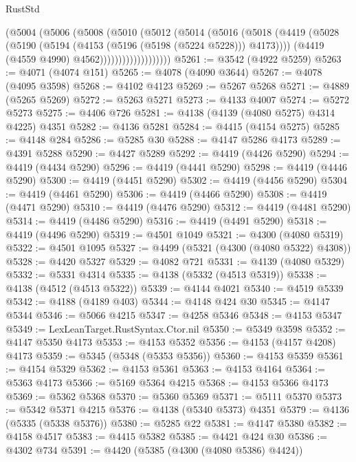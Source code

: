 \begin{lexlean}{RustStd}
\begin{coremodule}
                      (@5004
                        (@5006
                          (@5008
                            (@5010
                              (@5012
                                (@5014
                                  (@5016
                                    (@5018
                                      (@4419
                                        (@5028
                                          (@5190
                                            (@5194 (@4153 (@5196 (@5198 (@5224 @5228))) @4173))))
                                        (@4419 (@4559 @4990) @4562)))))))))))))))))))
@5261 := @3542 (@4922 @5259)
@5263 := @4071 (@4074 @151)
@5265 := @4078 (@4090 @3644)
@5267 := @4078 (@4095 @3598)
@5268 := @4102 @4123
@5269 := @5267 @5268
@5271 := @4889 (@5265 @5269)
@5272 := @5263 @5271
@5273 := @4133 @4007
@5274 := @5272 @5273
@5275 := @4406 @726
@5281 := @4138 (@4139 (@4080 @5275) @4314 @4225) @4351
@5282 := @4136 @5281
@5284 := @4415 (@4154 @5275)
@5285 := @4148 @284
@5286 := @5285 @30
@5288 := @4147 @5286 @4173
@5289 := @4391 @5288
@5290 := @4427 @5289
@5292 := @4419 (@4426 @5290)
@5294 := @4419 (@4434 @5290)
@5296 := @4419 (@4441 @5290)
@5298 := @4419 (@4446 @5290)
@5300 := @4419 (@4451 @5290)
@5302 := @4419 (@4456 @5290)
@5304 := @4419 (@4461 @5290)
@5306 := @4419 (@4466 @5290)
@5308 := @4419 (@4471 @5290)
@5310 := @4419 (@4476 @5290)
@5312 := @4419 (@4481 @5290)
@5314 := @4419 (@4486 @5290)
@5316 := @4419 (@4491 @5290)
@5318 := @4419 (@4496 @5290)
@5319 := @4501 @1049
@5321 := @4300 (@4080 @5319)
@5322 := @4501 @1095
@5327 := @4499 (@5321 (@4300 (@4080 @5322) @4308))
@5328 := @4420 @5327
@5329 := @4082 @721
@5331 := @4139 (@4080 @5329)
@5332 := @5331 @4314
@5335 := @4138 (@5332 (@4513 @5319))
@5338 := @4138 (@4512 (@4513 @5322))
@5339 := @4144 @4021
@5340 := @4519 @5339
@5342 := @4188 (@4189 @403)
@5344 := @4148 @424 @30
@5345 := @4147 @5344
@5346 := @5066 @4215
@5347 := @4258 @5346
@5348 := @4153 @5347
@5349 := LexLeanTarget.RustSyntax.Ctor.nil
@5350 := @5349 @3598
@5352 := @4147 @5350 @4173
@5353 := @4153 @5352
@5356 := @4153 (@4157 @4208) @4173
@5359 := @5345 (@5348 (@5353 @5356))
@5360 := @4153 @5359
@5361 := @4154 @5329
@5362 := @4153 @5361
@5363 := @4153 @4164
@5364 := @5363 @4173
@5366 := @5169 @5364 @4215
@5368 := @4153 @5366 @4173
@5369 := @5362 @5368
@5370 := @5360 @5369
@5371 := @5111 @5370
@5373 := @5342 @5371 @4215
@5376 := @4138 (@5340 @5373) @4351
@5379 := @4136 (@5335 (@5338 @5376))
@5380 := @5285 @22
@5381 := @4147 @5380
@5382 := @4158 @4517
@5383 := @4415 @5382
@5385 := @4421 @424 @30
@5386 := @4302 @734
@5391 := @4420 (@5385 (@4300 (@4080 @5386) @4424))

\end{coremodule}
\end{lexlean}
